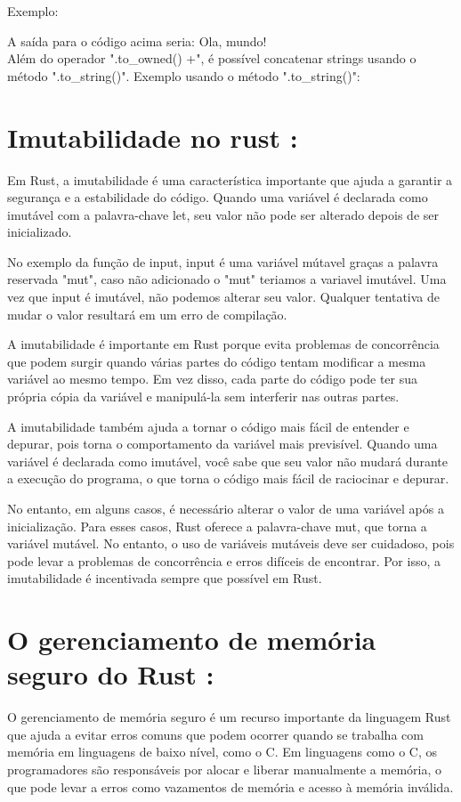 \documentclass[12pt,a4paper,oneside]{abntex2}
\begin{document}
Exemplo:


A saída para o código acima seria:
Ola, mundo!\\

Além do operador ".to\_owned() +", é possível concatenar strings usando o método ".to\_string()". Exemplo usando o método ".to\_string()":




\section{Imutabilidade no rust :}
Em Rust, a imutabilidade é uma característica importante que ajuda a garantir a segurança e a estabilidade do código. Quando uma variável é declarada como imutável com a palavra-chave let, seu valor não pode ser alterado depois de ser inicializado. 

No exemplo da função de input, input é uma variável mútavel graças a palavra reservada "mut", caso não adicionado o "mut" teriamos a variavel imutável. Uma vez que input é imutável, não podemos alterar seu valor. Qualquer tentativa de mudar o valor resultará em um erro de compilação.

A imutabilidade é importante em Rust porque evita problemas de concorrência que podem surgir quando várias partes do código tentam modificar a mesma variável ao mesmo tempo. Em vez disso, cada parte do código pode ter sua própria cópia da variável e manipulá-la sem interferir nas outras partes.

A imutabilidade também ajuda a tornar o código mais fácil de entender e depurar, pois torna o comportamento da variável mais previsível. Quando uma variável é declarada como imutável, você sabe que seu valor não mudará durante a execução do programa, o que torna o código mais fácil de raciocinar e depurar.

No entanto, em alguns casos, é necessário alterar o valor de uma variável após a inicialização. Para esses casos, Rust oferece a palavra-chave mut, que torna a variável mutável. No entanto, o uso de variáveis mutáveis deve ser cuidadoso, pois pode levar a problemas de concorrência e erros difíceis de encontrar. Por isso, a imutabilidade é incentivada sempre que possível em Rust.
\section{O gerenciamento de memória seguro do Rust :} 
O gerenciamento de memória seguro é um recurso importante da linguagem Rust que ajuda a evitar erros comuns que podem ocorrer quando se trabalha com memória em linguagens de baixo nível, como o C. Em linguagens como o C, os programadores são responsáveis por alocar e liberar manualmente a memória, o que pode levar a erros como vazamentos de memória e acesso à memória inválida.
\end{document}
